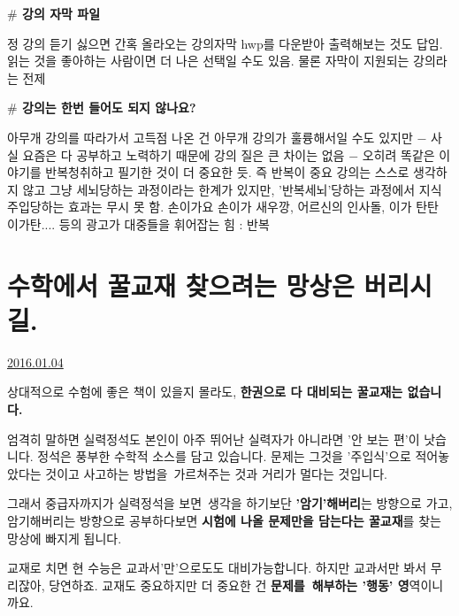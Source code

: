 \textbf{$\#$ 강의 자막 파일}
\vspace{5mm}

정 강의 듣기 싫으면 간혹 올라오는 강의자막 hwp를 다운받아 출력해보는 것도 답임.
읽는 것을 좋아하는 사람이면 더 나은 선택일 수도 있음.
물론 자막이 지원되는 강의라는 전제
\vspace{5mm}

\textbf{$\#$ 강의는 한번 들어도 되지 않나요?}
\vspace{5mm}

아무개 강의를 따라가서 고득점 나온 건 아무개 강의가 훌륭해서일 수도 있지만
$-$ 사실 요즘은 다 공부하고 노력하기 때문에 강의 질은 큰 차이는 없음 $-$
오히려 똑같은 이야기를 반복청취하고 필기한 것이 더 중요한 듯. 즉 반복이 중요
강의는 스스로 생각하지 않고 그냥 세뇌당하는 과정이라는 한계가 있지만,
'반복세뇌'당하는 과정에서 지식 주입당하는 효과는 무시 못 함.
손이가요 손이가 새우깡, 어르신의 인사돌, 이가 탄탄 이가탄.... 등의 광고가 대중들을 휘어잡는 힘 : 반복
\vspace{5mm}






\section{수학에서 꿀교재 찾으려는 망상은 버리시길.}
\href{https://www.kockoc.com/Apoc/575074}{2016.01.04}

\vspace{5mm}

상대적으로 수험에 좋은 책이 있을지 몰라도, \textbf{한권으로 다 대비되는 꿀교재는 없습니다.}
\vspace{5mm}

엄격히 말하면 실력정석도 본인이 아주 뛰어난 실력자가 아니라면 '안 보는 편'이 낫습니다.
정석은 풍부한 수학적 소스를 담고 있습니다.
문제는 그것을 '주입식'으로 적어놓았다는 것이고 사고하는 방법을 가르쳐주는 것과 거리가 멀다는 것입니다.
\vspace{5mm}

그래서 중급자까지가 실력정석을 보면 생각을 하기보단 \textbf{'암기'해버리}는 방향으로 가고,
암기해버리는 방향으로 공부하다보면 \textbf{시험에 나올 문제만을 담는다는 꿀교재}를 찾는 망상에 빠지게 됩니다.
\vspace{5mm}

교재로 치면 현 수능은 교과서'만'으로도도 대비가능합니다.
하지만 교과서만 봐서 무리잖아,
당연하죠. 교재도 중요하지만 더 중요한 건 \textbf{문제를 해부하는 '행동' 영}역이니까요.
\vspace{5mm}

